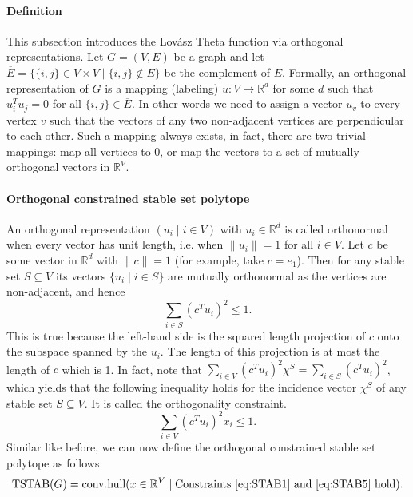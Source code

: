 \paragraph{Definition} This subsection introduces the Lov\'{a}sz Theta function via orthogonal representations. Let $G = (V,E)$ be a graph and let $\overline{E} = \{ \{i,j\} \in V \times V \mid \{i,j\} \not\in E \}$ be the complement of $E$. Formally, an orthogonal representation of $G$ is a mapping (labeling) $u: V \rightarrow \mathbb{R}^d$ for some $d$ such that $u_i^T u_j = 0$ for all $\{i,j\} \in \overline{E}$. In other words we need to assign a vector $u_v$ to every vertex $v$ such that the vectors of any two non-adjacent vertices are perpendicular to each other. Such a mapping always exists, in fact, there are two trivial mappings: map all vertices to 0, or map the vectors to a set of mutually orthogonal vectors in $\mathbb{R}^V$.

\paragraph{Orthogonal constrained stable set polytope}
An orthogonal representation $(u_i \mid i \in V)$ with $u_i \in \mathbb{R}^d$ is called orthonormal when every vector has unit length, i.e. when $\|u_i\| = 1$ for all $i \in V$. Let $c$ be some vector in $\mathbb{R}^d$ with $\|c\| = 1$ (for example, take $c = e_1$). Then for any stable set $S \subseteq V$ its vectors $\{u_i \mid i \in S\}$ are mutually orthonormal as the vertices are non-adjacent, and hence
%
\begin{equation*}
\sum_{i \in S} (c^T u_i)^2 \leq 1.
\end{equation*}
%
This is true because the left-hand side is the squared length projection of $c$ onto the subspace spanned by the $u_i$. The length of this projection is at most the length of $c$ which is 1. In fact, note that $\sum_{i \in V} (c^T u_i)^2 \chi^S = \sum_{i \in S} (c^T u_i)^2$, which yields that the following inequality holds for the incidence vector $\chi^S$ of any stable set $S \subseteq V$. It is called the orthogonality constraint.
%
\begin{equation}\label{eq:STAB5}
\sum_{i \in V} (c^T u_i)^2 x_i \leq 1.
\end{equation}
%
Similar like before, we can now define the orthogonal constrained stable set polytope as follows.
%
\begin{equation*}
\textrm{TSTAB}(G) = \textrm{conv.hull}( x \in \mathbb{R}^V \mid \textrm{Constraints } \eqref{eq:STAB1} \textrm{ and } \eqref{eq:STAB5} \textrm{ hold} ).
\end{equation*}

